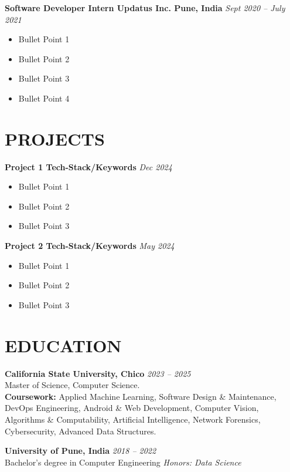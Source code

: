 \documentclass[letterpaper,10pt]{article}
\begin{document}
\noindent
\textbf{Software Developer Intern \textbar{} Updatus Inc. \textbar{} Pune, India} \hfill \textit{Sept 2020 -- July 2021}
\begin{itemize}[itemsep=0cm, topsep=0.1cm]
\justifying
    \item Bullet Point 1
    \item Bullet Point 2
    \item Bullet Point 3
    \item Bullet Point 4
\end{itemize}

\section*{\large PROJECTS}

\noindent
\textbf{Project 1 \textbar{} Tech-Stack/Keywords} \hfill \textit{Dec 2024}
\begin{itemize}[itemsep=0cm, topsep=0.1cm]
\justifying
    \item Bullet Point 1
    \item Bullet Point 2
    \item Bullet Point 3
\end{itemize}

\vspace{0.2cm}

\noindent
\textbf{Project 2 \textbar{} Tech-Stack/Keywords} \hfill \textit{May 2024}
\begin{itemize}[itemsep=0cm, topsep=0.1cm]
\justifying
    \item Bullet Point 1
    \item Bullet Point 2
    \item Bullet Point 3
\end{itemize}

\section*{\large EDUCATION}

\noindent
\textbf{California State University, Chico} \hfill \textit{2023 -- 2025} \\
Master of Science, Computer Science. \\
\textbf{Coursework:} Applied Machine Learning, Software Design \& Maintenance, DevOps Engineering, Android \& Web Development, Computer Vision, Algorithms \& Computability, Artificial Intelligence, Network Forensics, Cybersecurity, Advanced Data Structures.

\vspace{0.2cm}
\noindent
\textbf{University of Pune, India} \hfill \textit{2018 -- 2022} \\
Bachelor's degree in Computer Engineering \textbar{} \textit{Honors: Data Science}
\end{document}
